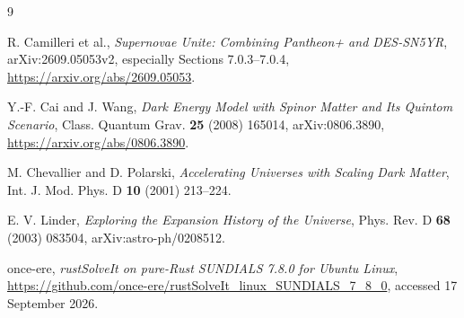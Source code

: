 \documentclass[11pt]{article}
\begin{document}
\begin{thebibliography}{9}
\raggedright

R. Camilleri et al.,
\emph{Supernovae Unite: Combining Pantheon+ and DES-SN5YR},
arXiv:2609.05053v2, especially Sections 7.0.3--7.0.4,
\url{https://arxiv.org/abs/2609.05053}.

Y.-F. Cai and J. Wang,
\emph{Dark Energy Model with Spinor Matter and Its Quintom Scenario},
Class. Quantum Grav. \textbf{25} (2008) 165014,
arXiv:0806.3890,
\url{https://arxiv.org/abs/0806.3890}.

M. Chevallier and D. Polarski,
\emph{Accelerating Universes with Scaling Dark Matter},
Int. J. Mod. Phys. D \textbf{10} (2001) 213--224.

E. V. Linder,
\emph{Exploring the Expansion History of the Universe},
Phys. Rev. D \textbf{68} (2003) 083504,
arXiv:astro-ph/0208512.

once-ere,
\emph{rustSolveIt on pure-Rust SUNDIALS 7.8.0 for Ubuntu Linux},
\url{https://github.com/once-ere/rustSolveIt_linux_SUNDIALS_7_8_0},
accessed 17 September 2026.

\end{thebibliography}
\end{document}
